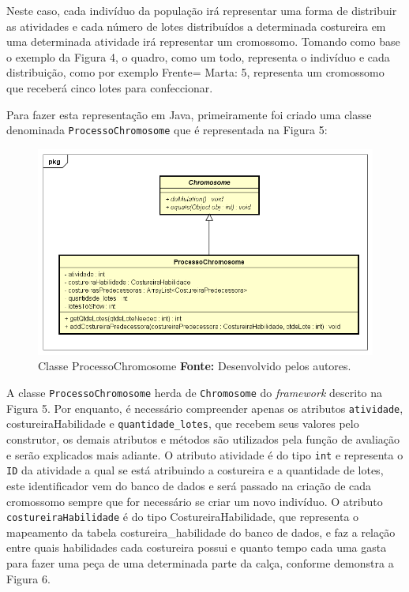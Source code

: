 \par Neste caso, cada indivíduo da população irá representar uma forma de
distribuir as atividades e cada número de lotes distribuídos a determinada
costureira em uma determinada atividade irá representar um cromossomo. Tomando como base o exemplo da Figura 4, o quadro, como um todo, representa o indivíduo e cada distribuição, como por exemplo Frente= Marta: 5, 
representa um cromossomo que receberá cinco lotes para confeccionar.

\par Para fazer esta representação em Java, primeiramente foi criado uma classe denominada \texttt{ProcessoChromosome} que é
representada na Figura 5:

\begin{figure}[h!]
	\centerline{\includegraphics[scale=0.6]{./imagens/processo_chromosome_diagram.png}}
	\caption[ProcessoChromosome Class]
	{Classe ProcessoChromosome \textbf{Fonte:} Desenvolvido pelos autores.}
	\label{fig:exemplo1}
\end{figure}


\par A classe \texttt{ProcessoChromosome} herda de \texttt{Chromosome} do
\textit{framework} descrito na Figura 5. Por enquanto, é necessário compreender
apenas os atributos \texttt{atividade}, costureiraHabilidade e
\texttt{quantidade\_lotes}, que recebem seus valores pelo construtor, os
demais atributos e métodos são utilizados pela função de avaliação e serão explicados mais adiante. 
O atributo atividade é do tipo \texttt{int} e representa o \texttt{ID} da atividade a qual se está
atribuindo a costureira e a quantidade de lotes, este identificador vem do banco de dados e será passado na criação 
de cada cromossomo sempre que for necessário se criar um novo indivíduo. O
atributo \texttt{costureiraHabilidade} é do tipo CostureiraHabilidade, que representa o
mapeamento da tabela costureira\_habilidade do banco de dados, e faz a relação
entre quais habilidades cada costureira possui e quanto tempo cada uma gasta para fazer uma peça de 
uma determinada parte da calça, conforme demonstra a Figura 6.

